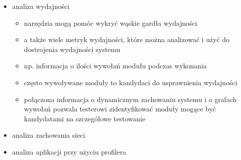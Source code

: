 \documentclass[../main.tex]{subfiles}
\begin{document}
\begin{itemize}
        \item analiza wydajności
        \begin{itemize}
            \item narzędzia mogą pomóc wykryć wąskie gardła wydajności
            \item a także wiele metryk wydajności, które można analizować i użyć do
            dostrojenia wydajności systemu
            \item np. informacja o ilości wywołań modułu podczas wykonania
            \item często wywoływane moduły to kandydaci do usprawnienia wydajności
            \item połączona informacja o dynamicznym zachowaniu systemu i o grafach
            wywołań pozwala testerowi zidentyfikować moduły mogące być kandydatami na szczegółowe testowanie
        \end{itemize}

        \item analiza zachowania sieci
        \item analiza aplikacji przy użyciu profilera
    \end{itemize}
\end{document}
